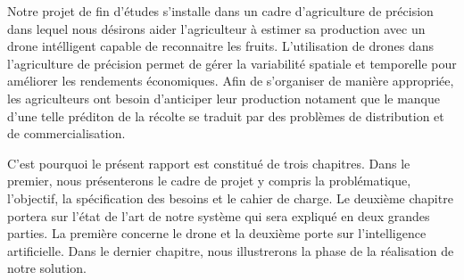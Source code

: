 



Notre projet de fin d'études s'installe dans un cadre d'agriculture de précision dans lequel nous désirons aider l'agriculteur à estimer sa production avec un drone intélligent capable de reconnaitre les fruits. L'utilisation de drones dans l'agriculture de précision permet de gérer la variabilité spatiale et temporelle pour améliorer les rendements économiques. Afin de s'organiser de manière appropriée, les agriculteurs ont besoin d'anticiper leur production notament que le manque d'une telle préditon de la récolte se traduit par des problèmes de distribution et de commercialisation.

C'est pourquoi le présent rapport est constitué de trois chapitres. 
Dans le premier, nous présenterons le cadre de projet y compris la problématique, l'objectif, la spécification des besoins et le cahier de charge. 
 Le deuxième chapitre portera sur l'état de l'art de notre système qui sera expliqué en deux grandes parties. La première concerne le drone et la deuxième porte sur l'intelligence artificielle. Dans le dernier chapitre, nous illustrerons la phase de la réalisation de notre solution.